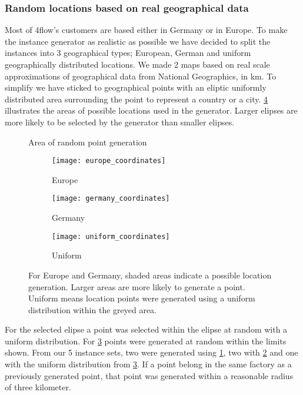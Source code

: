 \documentclass[../main.tex]{subfiles}
\begin{document}
\subsubsection{Random locations based on real geographical data}
Most of 4flow's customers are based either in Germany or in Europe. 
To make the instance generator as realistic as possible we have decided to split the instances into 3 geographical types; 
European, German and uniform geographically distributed locations.
We made 2 maps based on real scale approximations of geographical data from National Geographics, in km.
To simplify we have sticked to geographical points with an eliptic uniformly distributed area surrounding the point to represent a country or a city.
\cref{fig:areas} illustrates the areas of possible locations used in the generator. 
Larger elipses are more likely to be selected by the generator than smaller elipses.
\begin{figure}
\centering
    \caption{Area of random point generation}
    \begin{subfigure}[b]{0.3\textwidth}
        \centering
        \texttt{[image: europe\_coordinates]}
        \caption{Europe}
        \label{fig:eur}
    \end{subfigure}
    \hfill
    \begin{subfigure}[b]{0.3\textwidth}
        \centering
        \texttt{[image: germany\_coordinates]}
        \caption{Germany}
        \label{fig:ger}
    \end{subfigure}
    \hfill
    \begin{subfigure}[b]{0.3\textwidth}
        \centering
        \texttt{[image: uniform\_coordinates]}
        \caption{Uniform}
        \label{fig:uni}
    \end{subfigure}
    \label{fig:areas}
    \caption*{For Europe and Germany, shaded areas indicate a possible location generation. Larger areas are more likely to generate a point. Uniform means location points were generated using a uniform distribution within the greyed area.}
\end{figure}

For the selected elipse a point was selected within the elipse at random with a uniform distribution.
For \cref{fig:uni} points were generated at random within the limits shown.
From our 5 instance sets, two were generated using \cref{fig:eur}, two with \cref{fig:ger} and one with the uniform distribution from \cref{fig:uni}. 
If a point belong in the same factory as a previously generated point, that point was generated within a reasonable radius of three kilometer.
\end{document}
